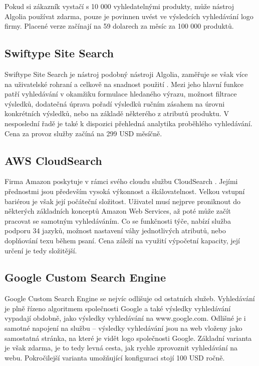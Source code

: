 \documentclass[FM,DP]{tulthesis}
\begin{document}
Pokud si zákazník vystačí s 10 000 vyhledatelnými produkty, může nástroj Algolia používat
zdarma, pouze je povinnen uvést ve výsledcích vyhledávání logo firmy. Placené verze 
začínají na 59 dolarech za měsíc za 100 000 produktů.

\subsection{Swiftype Site Search}

Swiftype Site Search je nástroj podobný nástroji Algolia, zaměřuje se však více na 
uživatelské rohraní a celkově na snadnost použití \cite{swiftype}. Mezi jeho hlavní
funkce patří vyhledávání v okamžiku formulace hledaného výrazu, možnost filtrace
výsledků, dodatečná úprava pořadí výsledků ručním zásahem na úrovni konkrétních 
výsledků, nebo na základě některého z atributů produktu. V nesposlední řadě je také
k dispozici přehledná analytika proběhlého vyhledávání. Cena za provoz služby
začíná na 299 USD měsíčně.

\subsection{AWS CloudSearch}

Firma Amazon poskytuje v rámci svého cloudu službu CloudSearch \cite{cloud-search}.
Jejími přednostmi jsou především vysoká výkonnost a škálovatelnost. Velkou vstupní
bariérou je však její počáteční složitost. Uživatel musí nejprve proniknout do 
některých základních konceptů Amazon Web Services, až poté může začít pracovat
se samotným vyhledáváním. Co se funkčnosti týče, nabízí služba podporu 34 jazyků, 
možnost nastavení váhy jednotlivých atributů, nebo doplňování texu během psaní.
Cena záleží na využití výpočetní kapacity, její určení je tedy složitější.

\subsection{Google Custom Search Engine}

Google Custom Search Engine \cite{gse} se nejvíc odlišuje od ostatních služeb. 
Vyhledávání je plně řízeno algoritmem společnosti Google a také výsledky vyhledávání
vypadají obdobně, jako výsledky vyhledávání na www.google.com. 
Odlišné je i samotné napojení na službu -- výsledky vyhledávání jsou na web
vloženy jako samostatná stránka, na které je vidět logo společnosti Google.
Základní varianta je však zdarma, je to tedy levná cesta, jak rychle zprovoznit
vyhledávání na webu. Pokročilejší varianta umožňující konfiguraci stojí 100 USD ročně.
\end{document}
